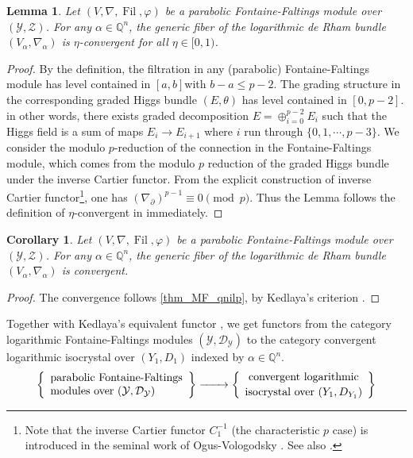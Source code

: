 \documentclass[12pt,twoside]{book}
\theoremstyle{plain}
\newtheorem{lemma}[lemma]{Lemma}
\newtheorem{corollary}[corollary]{Corollary}
\theoremstyle{definition}
\theoremstyle{remark}
\newcommand{\mD}{{\mathcal D}}
\newcommand{\mY}{{\mathcal Y}}
\newcommand{\mZ}{{\mathcal Z}}
\DeclareMathOperator\Fil{Fil}
\numberwithin{equation}{section}
\begin{document}
\begin{lemma}
\label{thm_MF_qnilp}
Let $(V,\nabla,\Fil,\varphi)$ be a parabolic Fontaine-Faltings module over $(\mY,\mZ)$. For any $\alpha \in \mathbb Q^n$, the generic fiber of the logarithmic de Rham bundle $(V_\alpha,\nabla_\alpha)$ is $\eta$-convergent for all $\eta\in[0,1)$.
\end{lemma}
\begin{proof}
By the definition, the filtration in any (parabolic) Fontaine-Faltings module has level contained in $[a,b]$with $b-a\leq p-2$. The grading structure in the corresponding graded Higgs bundle $(E,\theta)$ has level contained in $[0,p-2]$. in other words,
there exists graded decomposition $E=\oplus_{i=0}^{p-2} E_i$ such that
the Higgs field is a sum of maps $E_i\rightarrow E_{i+1}$ where $i$ run through $\{0,1,\cdots,p-3\}$. We consider the modulo $p$-reduction of the connection in the Fontaine-Faltings module, which comes from the modulo $p$ reduction of the graded Higgs bundle under the inverse Cartier functor. From the explicit construction of inverse Cartier functor\footnote{Note that the inverse Cartier functor $C_1^{-1}$ (the characteristic $p$ case) is introduced in the seminal work of Ogus-Vologodsky \cite{OgVo07}. See also \cite{LSZ19}.}, one has $\left(\nabla_{\partial}\right)^{p-1}\equiv 0\pmod{p}$. Thus the Lemma follows the definition of $\eta$-convergent in \cite[Definition 2.4.2]{Ked07} immediately.
\end{proof}

\begin{corollary} \label{thm_logFF2ConvLogdR} Let $(V,\nabla,\Fil,\varphi)$ be a parabolic Fontaine-Faltings module over $(\mY,\mZ)$. For any $\alpha\in\mathbb Q^n$, the generic fiber of the logarithmic de Rham bundle $(V_\alpha,\nabla_\alpha)$ is convergent.
\end{corollary}

\begin{proof}
The convergence follows \autoref{thm_MF_qnilp}, by Kedlaya's criterion \cite[2.5.6]{Ked07}.
\end{proof}
Together with Kedlaya's equivalent functor \cite[6.4.1]{Ked07}, we get functors from the category logarithmic Fontaine-Faltings modules $(\mY,\mD_\mY)$ to the category convergent logarithmic isocrystal over $(Y_1,D_1)$ indexed by $\alpha\in \mathbb Q^n$.
\begin{equation}\label{eq_logFF2logIsoc}
\left\{
\begin{array}{lll}
\text{parabolic Fontaine-Faltings}\\
\text{modules over $(\mY,\mD_{\mY})$}\\
\end{array}
\right\}
\xrightarrow{\quad\quad}
\left\{{\text{
convergent logarithmic
} \atop \text{
isocrystal over $(Y_1,D_{Y_1})$
}}\right\}
\end{equation}
\end{document}
